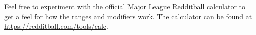 
Feel free to experiment with the official Major League Redditball calculator
to get a feel for how the ranges and modifiers work.
The calculator can be found at \url{https://redditball.com/tools/calc}.



\pagebreak


\pagebreak

